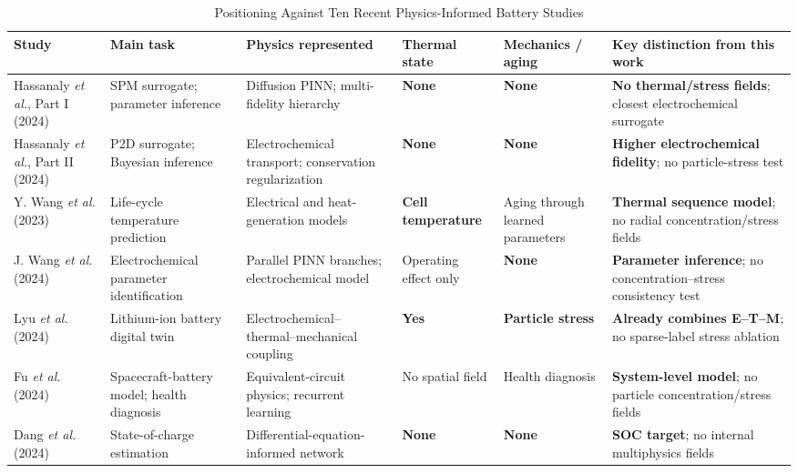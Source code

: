 \documentclass[conference]{IEEEtran}
\begin{document}
\begin{table}[t]
\centering
\caption{Positioning Against Ten Recent Physics-Informed Battery Studies}
\label{tab:gap}
\scriptsize
\renewcommand{\arraystretch}{1.08}
\setlength{\tabcolsep}{2.5pt}
\begin{tabular}{>{\raggedright\arraybackslash}p{2.55cm}>{\raggedright\arraybackslash}p{2.55cm}>{\raggedright\arraybackslash}p{3.0cm}>{\raggedright\arraybackslash}p{1.65cm}>{\raggedright\arraybackslash}p{2.35cm}>{\raggedright\arraybackslash}p{3.7cm}}
\toprule
Study & Main task & Physics represented & Thermal state & Mechanics / aging & Key distinction from this work \\
\midrule
Hassanaly \emph{et al.}, Part I (2024) \cite{hassanaly2024part1} & SPM surrogate; parameter inference & Diffusion PINN; multi-fidelity hierarchy & \textbf{None} & \textbf{None} & \textbf{No thermal/stress fields}; closest electrochemical surrogate \\
\addlinespace[1pt]
Hassanaly \emph{et al.}, Part II (2024) \cite{hassanaly2024part2} & P2D surrogate; Bayesian inference & Electrochemical transport; conservation regularization & \textbf{None} & \textbf{None} & \textbf{Higher electrochemical fidelity}; no particle-stress test \\
\addlinespace[1pt]
Y. Wang \emph{et al.} (2023) \cite{wang2023temperature} & Life-cycle temperature prediction & Electrical and heat-generation models & \textbf{Cell temperature} & Aging through learned parameters & \textbf{Thermal sequence model}; no radial concentration/stress fields \\
\addlinespace[1pt]
J. Wang \emph{et al.} (2024) \cite{wang2024parameter} & Electrochemical parameter identification & Parallel PINN branches; electrochemical model & Operating effect only & \textbf{None} & \textbf{Parameter inference}; no concentration--stress consistency test \\
\addlinespace[1pt]
Lyu \emph{et al.} (2024) \cite{lyu2024digitaltwin} & Lithium-ion battery digital twin & Electrochemical--thermal--mechanical coupling & \textbf{Yes} & \textbf{Particle stress} & \textbf{Already combines E--T--M}; no sparse-label stress ablation \\
\addlinespace[1pt]
Fu \emph{et al.} (2024) \cite{fu2024spacecraft} & Spacecraft-battery model; health diagnosis & Equivalent-circuit physics; recurrent learning & No spatial field & Health diagnosis & \textbf{System-level model}; no particle concentration/stress fields \\
\addlinespace[1pt]
Dang \emph{et al.} (2024) \cite{dang2024soc} & State-of-charge estimation & Differential-equation-informed network & \textbf{None} & \textbf{None} & \textbf{SOC target}; no internal multiphysics fields \\

\end{tabular}
\end{table}
\end{document}
